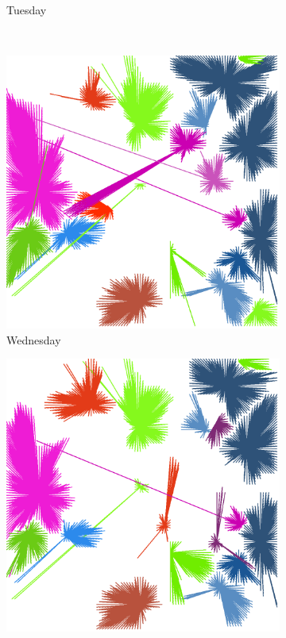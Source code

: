 \documentclass[12pt,a4paper]{article}
\begin{document}
\begin{figure}[H]
\begin{subfigure}[b]{0.48\textwidth}
\caption{Tuesday}
\end{subfigure}
\\
\begin{subfigure}[b]{0.48\textwidth}
\includegraphics[width=\textwidth]{weekDef/edges-3Wed-mid.png}
\caption{Wednesday}
\end{subfigure}
\begin{subfigure}[b]{0.48\textwidth}
\includegraphics[width=\textwidth]{weekDef/edges-4Thu-mid.png}

\end{subfigure}
\end{figure}
\end{document}
